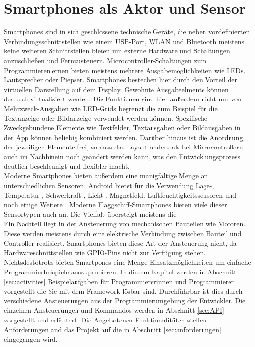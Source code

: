 \documentclass[11pt,a4paper]{report}
\begin{document}
\chapter{Smartphones als Aktor und Sensor} \label{chap:Experimente}
Smartphones sind in sich geschlossene technische Geräte, die neben vordefinierten Verbindungsschnittstellen wie einem USB-Port, WLAN und Bluetooth meistens keine weiteren Schnittstellen bieten um externe Hardware und Schaltungen anzuschließen und Fernzusteuern.
Microcontroller-Schaltungen zum Programmierenlernen bieten meistens mehrere Ausgabemöglichkeiten wie LEDs, Lautsprecher oder Piepser.
Smartphones bestechen hier durch den Vorteil der virtuellen Darstellung auf dem Display.
Gewohnte Ausgabeelmente können dadurch virtualisiert werden.
Die Funktionen sind hier außerdem nicht nur von Mehrzweck-Ausgaben wie LED-Grids begrenzt die zum Beispiel für die Textanzeige oder Bildanzeige verwendet werden können.
Spezifische Zweckgebundene Elemente wie Textfelder, Textausgaben oder Bildausgaben in der App können beliebig kombiniert werden.
Darüber hinaus ist die Anordnung der jeweiligen Elemente frei, so dass das Layout anders als bei Microcontrollern auch im Nachhinein noch geändert werden kann, was den Entwicklungsprozess deutlich beschleunigt und flexibler macht.
\\
Moderne Smartphones bieten außerdem eine manigfaltige Menge an unterschiedlichen Sensoren.
Android bietet für die Verwendung Lage-, Temperatur-, Schwerkraft-, Licht-, Magnetfeld, Luftfeuchtigkeitssensoren und noch einige Weitere \cite{sensoren_android}.
Moderne Flaggschiff-Smartphones bieten viele dieser Sensortypen auch an.
Die Vielfalt übersteigt meistens die 
\\
Ein Nachteil liegt in der Ansteuerung von mechanischen Bauteilen wie Motoren.
Diese werden meistens durch eine elektrische Verbindung zwischen Bauteil und Controller realisiert.
Smartphones bieten diese Art der Ansteuerung nicht, da Hardwareschnittstellen wie GPIO-Pins nicht zur Verfügung stehen.
\\
Nichtsdestotrotz bieten Smartpones eine Menge Einsatzmöglichkeiten um einfache Programmierbeispiele auszuprobieren.
In diesem Kapitel werden in Abschnitt \ref{sec:activities} Beispielaufgaben für Programmiererinnen und Programmierer vorgestellt die Sie mit dem Framework lösbar sind.
Durchführbar ist dies durch verschiedene Ansteuerungen aus der Programmierumgebung der Entwickler.
Die einzelnen Ansteuerungen und Kommandos werden in Abschnitt \ref{sec:API} vorgestellt und erläutert.
Die Angebotenen Funktionalitäten stellen Anforderungen and das Projekt auf die in Abschnitt \ref{sec:anforderungen} eingegangen wird.
\end{document}
